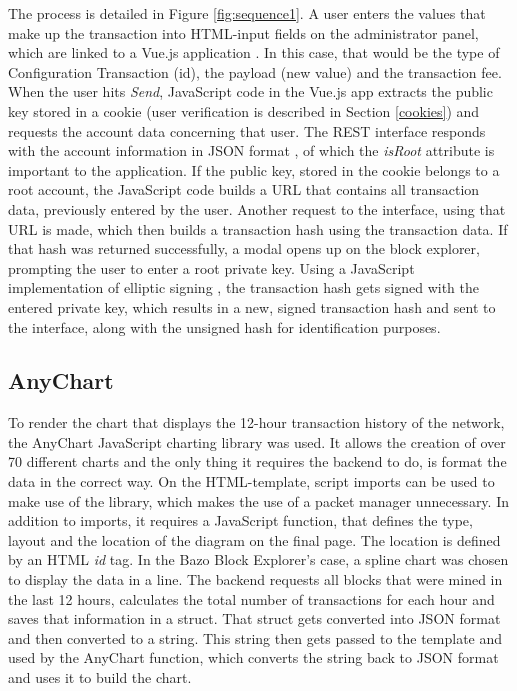 The process is detailed in Figure \ref{fig:sequence1}. A user enters the values that make up the transaction into HTML-input fields on the administrator panel, which are linked to a Vue.js application \cite{vue} . In this case, that would be the type of Configuration Transaction (id), the payload (new value) and the transaction fee. When the user hits \emph{Send}, JavaScript code in the Vue.js app extracts the public key stored in a cookie \cite{vcookies} (user verification is described in Section \ref{cookies}) and requests the account data concerning that user. The REST interface responds with the account information in JSON format \cite{json}, of which the \emph{isRoot} attribute is important to the application. If the public key, stored in the cookie belongs to a root account, the JavaScript code builds a URL that contains all transaction data, previously entered by the user. Another request to the interface, using that URL is made, which then builds a transaction hash using the transaction data. If that hash was returned successfully, a modal opens up on the block explorer, prompting the user to enter a root private key. Using a JavaScript implementation of elliptic signing \cite{elliptic}, the transaction hash gets signed with the entered private key, which results in a new, signed transaction hash and sent to the interface, along with the unsigned hash for identification purposes.

\subsection{AnyChart} \label{chart}
To render the chart that displays the 12-hour transaction history of the network, the AnyChart JavaScript charting library \cite{anychart} was used. It allows the creation of over 70 different charts and the only thing it requires the backend to do, is format the data in the correct way. On the HTML-template, script imports can be used to make use of the library, which makes the use of a packet manager unnecessary. In addition to imports, it requires a JavaScript function, that defines the type, layout and the location of the diagram on the final page. The location is defined by an HTML \emph{id} tag. In the Bazo Block Explorer's case, a spline chart was chosen to display the data in a line.
The backend requests all blocks that were mined in the last 12 hours, calculates the total number of transactions for each hour and saves that information in a struct. That struct gets converted into JSON format and then converted to a string. This string then gets passed to the template and used by the AnyChart function, which converts the string back to JSON format and uses it to build the chart.

